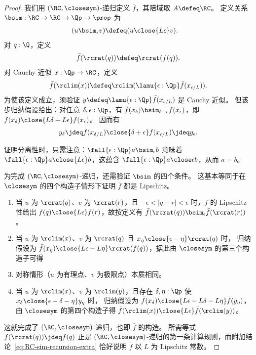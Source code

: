 \begin{proof}
  我们用 $(\RC,\closesym)$-递归定义 $\bar{f}$，其陪域取 $A\defeq \RC$。
  定义关系 $\mathord{\bsim}: \RC \to \RC \to \Qp \to \prop$ 为
  \begin{align*}
    (u \bsim_\epsilon v) &\defeq (u \close{L\epsilon} v).
  \end{align*}
  对 $q : \Q$，定义
  \begin{equation*}
    \bar{f}(\rcrat(q)) \defeq \rcrat(f(q)).
  \end{equation*}
  对 Cauchy 近似 $x : \Qp \to \RC$，定义
  \begin{equation*}
    \bar{f}(\rclim(x)) \defeq \rclim(\lamu{\epsilon : \Qp} \bar{f}(x_{\epsilon/L})).
  \end{equation*}
  为使该定义成立，须验证 $y \defeq \lamu{\epsilon : \Qp} \bar{f}(x_{\epsilon/L})$ 是 Cauchy 近似。
  但该步归纳假设给出：对任意 $\delta,\epsilon:\Qp$，有 $\bar{f}(x_\delta) \bsim_{\delta+\epsilon} \bar{f}(x_\epsilon)$，即 $\bar{f}(x_\delta) \close{L\delta+L\epsilon} \bar{f}(x_\epsilon)$。
  因而有
  \[y_\delta \jdeq f(x_{\delta/L}) \close{\delta + \epsilon} f(x_{\epsilon/L})   \jdeq y_\epsilon. \]

  证明分离性时，只需注意：$\fall{\epsilon:\Qp} a\bsim_\epsilon b$ 意味着 $\fall{\epsilon:\Qp} a\close{L\epsilon} b$，这蕴含 $\fall{\epsilon:\Qp}a\close\epsilon b$，从而 $a=b$。

  为完成 $(\RC,\closesym)$-递归，还需验证 $\bsim$ 的四个条件。
  这基本等同于在 $\closesym$ 的四个构造子情形下证明 $\bar f$ 都是 Lipschitz。
  \begin{enumerate}
  \item 当 $u$ 为 $\rcrat(q)$、$v$ 为 $\rcrat(r)$，且 $-\epsilon < |q-r| <\epsilon$ 时，$f$ 的 Lipschitz 性给出 $f(q) \close{L\epsilon} f(r)$，故按定义有 $\bar{f}(\rcrat(q)) \bsim_\epsilon \bar{f}(\rcrat(r))$。
  \item 当 $u$ 为 $\rclim(x)$、$v$ 为 $\rcrat(q)$ 且 $x_\eta \close{\epsilon - \eta} \rcrat(q)$ 时，
      归纳假设为 $\bar{f}(x_\eta) \close{L \epsilon - L \eta} \rcrat(f(q))$，据此由 $\closesym$ 的第三个构造子可得
  \item 对称情形（$u$ 为有理点、$v$ 为极限点）本质相同。
  \item 当 $u$ 为 $\rclim(x)$、$v$ 为 $\rclim(y)$，且存在 $\delta, \eta : \Qp$ 使 $x_\delta \close{\epsilon - \delta - \eta} y_\eta$ 时，
      归纳假设为 $\bar{f}(x_\delta) \close{L \epsilon - L \delta - L \eta} \bar{f}(y_\eta)$，由 $\closesym$ 的第四个构造子得 $\bar{f}(\rclim(x)) \close{L
        \epsilon} \bar{f}(\rclim(y))$。
  \end{enumerate}
  这就完成了 $(\RC,\closesym)$-递归，也即 $\bar f$ 的构造。
  所需等式 $\bar f(\rcrat(q))\jdeq f(q)$ 正是 $(\RC,\closesym)$-递归的第一条计算规则，而附加结论~\eqref{eq:RC-sim-recursion-extra} 恰好说明 $\bar f$ 以 $L$ 为 Lipschitz 常数。
\end{proof}

